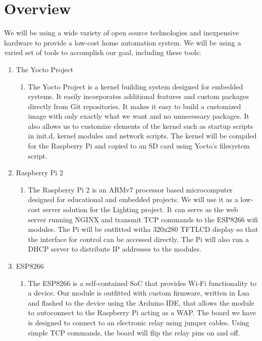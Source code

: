 \documentclass[oneside,openright]{scrreprt}
\begin{document}
\section{Overview}
We will be using a wide variety of open source technologies and inexpensive hardware to provide a low-cost home automation system. We will be using a varied set of tools to accomplish our goal, including these tools:
\begin{enumerate}
\item The Yocto Project 
\begin{enumerate}
\item The Yocto Project is a kernel building system designed for embedded systems. It easily incorporates additional features and custom packages directly from Git repositories. It makes it easy to build a customized image with only exactly what we want and no unnecessary packages. It also allows us to customize elements of the kernel such as startup scripts in init.d, kernel modules and network scripts. The kernel will be compiled for the Raspberry Pi and copied to an SD card using Yocto's filesystem script.
\end{enumerate} 
\item Raspberry Pi 2
\begin{enumerate}
\item The Raspberry Pi 2 is an ARMv7 processor based microcomputer designed for educational and embedded projects. We will use it as a low-cost server solution for the Lighting project. It can serve as the web server running NGINX and transmit TCP commands to the ESP8266 wifi modules. The Pi will be outfitted witha 320x280 TFTLCD display so that the interface for control can be accessed directly. The Pi will also run a DHCP server to distribute IP addresses to the modules.
\end{enumerate} 
\item ESP8266
\begin{enumerate}
\item The ESP8266 is a self-contained SoC that provides Wi-Fi functionality to a device. Our module is outfitted with custom firmware, written in Lua and flashed to the device using the Arduino IDE, that allows the module to autoconnect to the Raspberry Pi acting as a WAP. The board we have is designed to connect to an electronic relay using jumper cables. Using simple TCP commands, the board will flip the relay pins on and off.
\end{enumerate}
\end{enumerate}
\end{document}
